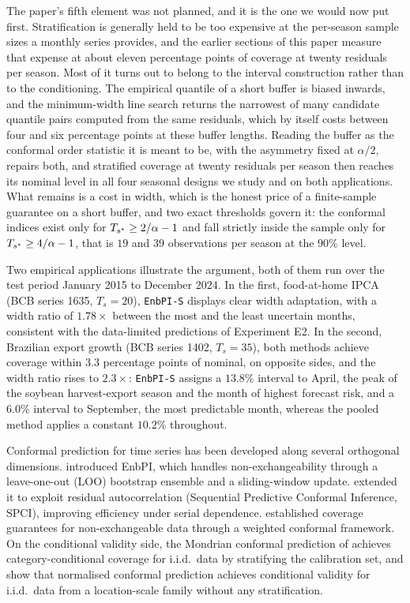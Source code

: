 The paper's fifth element was not planned, and it is the one we would
now put first.  Stratification is generally held to be too expensive at
the per-season sample sizes a monthly series provides, and the earlier
sections of this paper measure that expense at about eleven percentage
points of coverage at twenty residuals per season.  Most of it turns
out to belong to the interval construction rather than to the
conditioning.  The empirical quantile of a short buffer is biased
inwards, and the minimum-width line search returns the narrowest of
many candidate quantile pairs computed from the same residuals, which
by itself costs between four and six percentage points at these buffer
lengths.  Reading the buffer as the conformal order statistic it is
meant to be, with the asymmetry fixed at $\alpha/2$, repairs both, and
stratified coverage at twenty residuals per season then reaches its
nominal level in all four seasonal designs we study and on both
applications.  What remains is a cost in width, which is the honest
price of a finite-sample guarantee on a short buffer, and two exact
thresholds govern it: the conformal indices exist only for
$T_{s^*} \geq 2/\alpha - 1$ and fall strictly inside the sample only for
$T_{s^*} \geq 4/\alpha - 1$, that is $19$ and $39$ observations per season
at the $90\%$ level.

Two empirical applications illustrate the argument, both of them run
over the test period January 2015 to December 2024.  In the first,
food-at-home IPCA (BCB series 1635, $T_s = 20$), \texttt{EnbPI-S}
displays clear width adaptation, with a width ratio of $1.78\times$
between the most and the least uncertain months, consistent with the
data-limited predictions of Experiment E2.  In the second, Brazilian
export growth (BCB series 1402, $T_s = 35$), both methods achieve
coverage within $3.3$ percentage points of nominal, on opposite
sides, and the width ratio rises to $2.3\times$: \texttt{EnbPI-S}
assigns a $13.8\%$ interval to April, the peak of the soybean
harvest-export season and the month of highest forecast risk, and a
$6.0\%$ interval to September, the most predictable month, whereas
the pooled method applies a constant $10.2\%$ throughout.

Conformal prediction for time series has been developed along several
orthogonal dimensions.  \citet{xu2023conformal} introduced EnbPI,
which handles non-exchangeability through a leave-one-out (LOO)
bootstrap ensemble and a sliding-window update.
\citet{xu2023sequential} extended it to exploit residual
autocorrelation (Sequential Predictive Conformal Inference, SPCI),
improving efficiency under serial dependence.
\citet{barber2023conformal} established coverage guarantees for
non-exchangeable data through a weighted conformal framework.
On the conditional validity side, the Mondrian conformal prediction
of \citet{vovk2005mondrian} achieves category-conditional coverage
for i.i.d.\ data by stratifying the calibration set, and
\citet{dewolf2025conditional} show that normalised conformal
prediction achieves conditional validity for i.i.d.\ data from a
location-scale family without any stratification.

